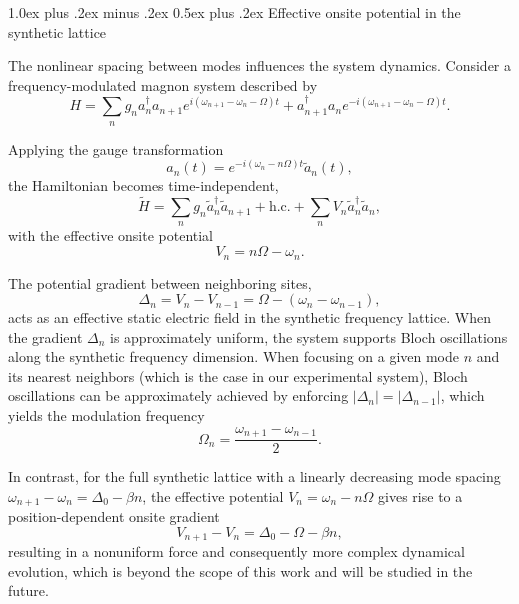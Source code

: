 \documentclass[
twocolumn,

superscriptaddress,









 amsmath,amssymb,
 aps,


prl,




]{revtex4-2}
\makeatletter
\providecommand{\subsubsection}{}
\renewcommand{\subsubsection}{
  \@startsection{subsubsection}{3}{0pt}
    {1.0ex plus .2ex minus .2ex}
    {0.5ex plus .2ex}
    {\normalfont\normalsize\bfseries\filcenter}
}
\makeatother
\begin{document}
\subsubsection{Effective onsite potential in the synthetic lattice}


The nonlinear spacing between modes influences the system dynamics. Consider a frequency-modulated magnon system described by
\begin{equation}
H = \sum_n g_n a_n^\dagger a_{n+1} e^{i(\omega_{n+1}-\omega_n-\Omega)t} + a_{n+1}^\dagger a_n e^{-i(\omega_{n+1}-\omega_n-\Omega)t}.
\end{equation}

Applying the gauge transformation
\begin{equation}
a_n(t) = e^{-i(\omega_n - n\Omega)t} \tilde{a}_n(t),
\end{equation}
the Hamiltonian becomes time-independent,
\begin{equation}
\tilde{H} = \sum_n g_n \tilde{a}_n^\dagger \tilde{a}_{n+1} + \text{h.c.} + \sum_n V_n \tilde{a}_n^\dagger \tilde{a}_n,
\end{equation}
with the effective onsite potential
\begin{equation}
V_n = n\Omega - \omega_n.
\end{equation}

The potential gradient between neighboring sites,
\begin{equation}
\Delta_n = V_n - V_{n-1} = \Omega - (\omega_n - \omega_{n-1}),
\end{equation}
acts as an effective static electric field in the synthetic frequency lattice. When the gradient $\Delta_n$ is approximately uniform, the system supports Bloch oscillations along the synthetic frequency dimension. When focusing on a given mode $n$ and its nearest neighbors (which is the case in our experimental system), Bloch oscillations can be approximately achieved by enforcing $|\Delta_n| = |\Delta_{n-1}|$, which yields the modulation frequency
\begin{equation}
\Omega_n = \frac{\omega_{n+1} - \omega_{n-1}}{2}.
\end{equation}

In contrast, for the full synthetic lattice with a linearly decreasing mode spacing $\omega_{n+1} - \omega_n = \Delta_0 - \beta n$, the effective potential $V_n = \omega_n - n\Omega$ gives rise to a position-dependent onsite gradient
\begin{equation}
V_{n+1} - V_n = \Delta_0 - \Omega - \beta n,
\end{equation}
resulting in a nonuniform force and consequently more complex dynamical evolution, which is beyond the scope of this work and will be studied in the future.
\end{document}
